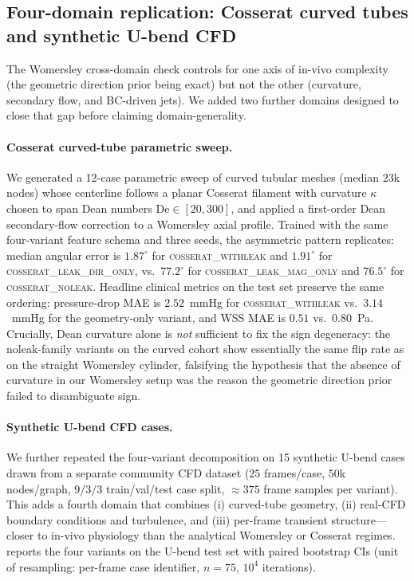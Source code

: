 \documentclass[10pt,a4paper]{article}
\begin{document}
\subsection*{Four-domain replication: Cosserat curved tubes and synthetic U-bend CFD}
\label{sec:fourth_domain}

The Womersley cross-domain check controls for one axis of in-vivo
complexity (the geometric direction prior being exact) but not the
other (curvature, secondary flow, and BC-driven jets). We added two
further domains designed to close that gap before claiming
domain-generality.

\paragraph{Cosserat curved-tube parametric sweep.}
We generated a 12-case parametric sweep of curved tubular meshes
(median $23$k nodes) whose centerline follows a planar Cosserat
filament with curvature $\kappa$ chosen to span Dean numbers
$\mathrm{De}\in[20,300]$, and applied a first-order Dean
secondary-flow correction to a Womersley axial profile. Trained with
the same four-variant feature schema and three seeds, the asymmetric
pattern replicates: median angular error is $1.87^\circ$ for
\textsc{cosserat\_withleak} and $1.91^\circ$ for
\textsc{cosserat\_leak\_dir\_only}, vs.\ $77.2^\circ$ for
\textsc{cosserat\_leak\_mag\_only} and $76.5^\circ$ for
\textsc{cosserat\_noleak}. Headline clinical metrics on the test set
preserve the same ordering: pressure-drop MAE is $2.52$~mmHg for
\textsc{cosserat\_withleak} vs.\ $3.14$~mmHg for the geometry-only
variant, and WSS MAE is $0.51$ vs.\ $0.80$~Pa. Crucially, Dean
curvature alone is \emph{not} sufficient to fix the sign degeneracy:
the noleak-family variants on the curved cohort show essentially the
same flip rate as on the straight Womersley cylinder, falsifying the
hypothesis that the absence of curvature in our Womersley setup was
the reason the geometric direction prior failed to disambiguate sign.

\paragraph{Synthetic U-bend CFD cases.}
We further repeated the four-variant decomposition on 15 synthetic
U-bend cases drawn from a separate community CFD dataset
($25$ frames/case, $50$k nodes/graph, $9/3/3$ train/val/test case
split, $\approx\!375$ frame samples per variant). This adds a fourth
domain that combines (i) curved-tube geometry, (ii) real-CFD
boundary conditions and turbulence, and (iii) per-frame transient
structure---closer to in-vivo physiology than the analytical
Womersley or Cosserat regimes.  reports
the four variants on the U-bend test set with paired bootstrap CIs
(unit of resampling: per-frame case identifier, $n\!=\!75$,
$10^4$ iterations).
\end{document}
